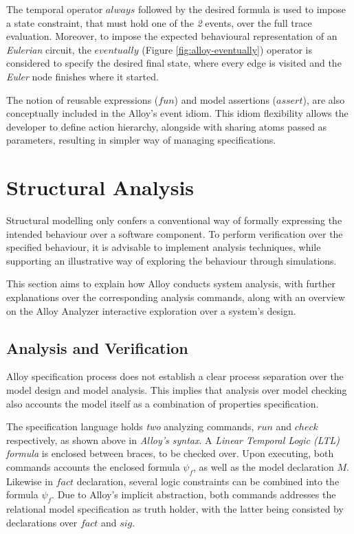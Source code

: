 The temporal operator $always$ followed by the desired formula is used to impose a state constraint, that must hold one of the \textit{2} events, over the full trace evaluation. Moreover, to impose the expected behavioural representation of an \textit{Eulerian} circuit, the $eventually$ (Figure \ref{fig:alloy-eventually}) operator is considered to specify the desired final state, where every edge is visited and the \textit{Euler} node finishes where it started.

The notion of reusable expressions ($fun$) and model assertions ($assert$), are also conceptually included in the Alloy's event idiom. This idiom flexibility allows the developer to define action hierarchy, alongside with sharing atoms passed as parameters, resulting in simpler way of managing specifications. \cite{lwspecification, alloy-docs}


\section{Structural Analysis}

Structural modelling only confers a conventional way of formally expressing the intended behaviour over a software component. To perform verification over the specified behaviour, it is advisable to implement analysis techniques, while supporting an illustrative way of exploring the behaviour through simulations. 

This section aims to explain how Alloy conducts system analysis, with further explanations over the corresponding analysis commands, along with an overview on the Alloy Analyzer interactive exploration over a system's design. 

\subsection{Analysis and Verification}

Alloy specification process does not establish a clear process separation over the model design and model analysis. This implies that analysis over model checking also accounts the model itself as a combination of properties specification. 

The specification language holds \textit{two} analyzing commands, $run$ and $check$ respectively, as shown above in \textit{Alloy's syntax}. A \textit{Linear Temporal Logic (LTL) formula} is enclosed between braces, to be checked over. Upon executing, both commands accounts the enclosed formula $\psi_{f}$, as well as the model declaration ${M}$. Likewise in $fact$ declaration, several logic constraints can be combined into the formula $\psi_{f}$. Due to Alloy's implicit abstraction, both commands addresses the relational model specification as truth holder, with the latter being consisted by declarations over $fact$ and $sig$. 


